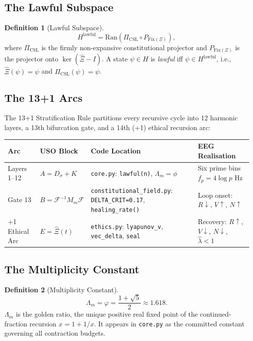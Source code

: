 \documentclass[12pt,a4paper]{article}
\theoremstyle{definition}
\newtheorem{definition}{Definition}[section]
\newcommand{\Hlawful}{H^{\mathrm{lawful}}}
\newcommand{\Pcsll}{\Pi_{\mathrm{CSL}}}
\newcommand{\Lm}{\Lambda_m}
\newcommand{\lhat}{\hat{\lambda}}
\begin{document}
\subsection{The Lawful Subspace}

\begin{definition}[Lawful Subspace]
  \begin{equation}
    \Hlawful = \mathrm{Ran}\!\left(\Pcsll \circ P_{\mathrm{Fix}(\Xi)}\right),
  \end{equation}
  where $\Pcsll$ is the firmly non-expansive constitutional projector and
  $P_{\mathrm{Fix}(\Xi)}$ is the projector onto $\ker(\hat{\Xi} - I)$.
  A state $\psi \in H$ is \emph{lawful} iff $\psi \in \Hlawful$, i.e.,
  $\hat{\Xi}(\psi) = \psi$ and $\Pcsll(\psi) = \psi$.
\end{definition}

\subsection{The 13+1 Arcs}

The 13+1 Stratification Rule partitions every recursive cycle into
12 harmonic layers, a 13th bifurcation gate, and a 14th (+1) ethical
recursion arc:

\begin{longtable}{@{}p{2.5cm}p{4cm}p{4.5cm}p{3.5cm}@{}}
  \toprule
  \textbf{Arc} & \textbf{USO Block} & \textbf{Code Location} &
  \textbf{EEG Realisation} \\
  \midrule
  Layers 1--12 & $A = D_\sigma + K$ &
    \texttt{core.py}: \texttt{lawful(n)}, $\Lm = \phi$ &
    Six prime bins $f_p = 4\log p$ Hz \\
  Gate 13 & $B = \mathcal{F}^{-1}M_m\mathcal{F}$ &
    \texttt{constitutional\_field.py}: \texttt{DELTA\_CRIT=0.17},
    \texttt{healing\_rate()} &
    Loop onset: $R \downarrow$, $V \uparrow$, $N \uparrow$ \\
  +1 Ethical Arc & $E = \hat{\Xi}(t)$ &
    \texttt{ethics.py}: \texttt{lyapunov\_v}, \texttt{vec\_delta},
    \texttt{seal} &
    Recovery: $R \uparrow$, $V \downarrow$, $N \downarrow$, $\lhat < 1$ \\
  \bottomrule
\end{longtable}

\subsection{The Multiplicity Constant}

\begin{definition}[Multiplicity Constant]
  \begin{equation}
    \Lm = \varphi = \frac{1+\sqrt{5}}{2} \approx 1.618.
  \end{equation}
  $\Lm$ is the golden ratio, the unique positive real fixed point of the
  continued-fraction recursion $x = 1 + 1/x$.  It appears in
  \texttt{core.py} as the committed constant governing all contraction
  budgets.
\end{definition}
\end{document}
